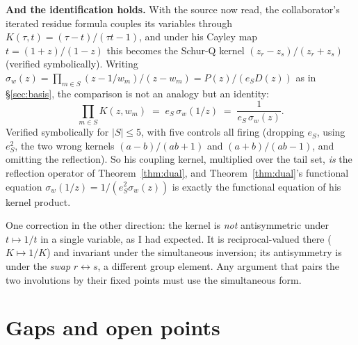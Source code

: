\documentclass[11pt]{article}
\theoremstyle{definition}
\theoremstyle{remark}
\begin{document}
\textbf{And the identification holds.} With the source now read, the collaborator's iterated
residue formula couples its variables through $K(\tau,t)=(\tau-t)/(\tau t-1)$, and under his
Cayley map $t=(1+z)/(1-z)$ this becomes the Schur-Q kernel $(z_r-z_s)/(z_r+z_s)$ (verified
symbolically). Writing $\sigma_w(z)=\prod_{m\in S}(z-1/w_m)/(z-w_m)=P(z)/(e_SD(z))$ as in
\S\ref{sec:basis}, the comparison is not an analogy but an identity:
\[
  \prod_{m\in S}K(z,w_m)\;=\;e_S\,\sigma_w(1/z)\;=\;\frac{1}{e_S\,\sigma_w(z)} .
\]
Verified symbolically for $|S|\le5$, with five controls all firing (dropping $e_S$, using
$e_S^2$, the two wrong kernels $(a-b)/(ab+1)$ and $(a+b)/(ab-1)$, and omitting the reflection).
So his coupling kernel, multiplied over the tail set, \emph{is} the reflection operator of
Theorem~\ref{thm:dual}, and Theorem~\ref{thm:dual}'s functional equation
$\sigma_w(1/z)=1/(e_S^2\sigma_w(z))$ is exactly the functional equation of his kernel product.

One correction in the other direction: the kernel is \emph{not} antisymmetric under
$t\mapsto1/t$ in a single variable, as I had expected. It is reciprocal-valued there
($K\mapsto1/K$) and invariant under the simultaneous inversion; its antisymmetry is under the
\emph{swap} $r\leftrightarrow s$, a different group element. Any argument that pairs the two
involutions by their fixed points must use the simultaneous form.

\section{Gaps and open points}\label{sec:gaps}
\end{document}
